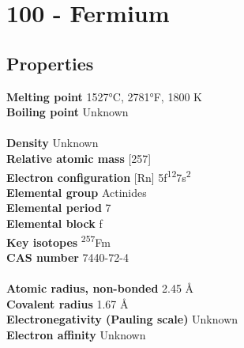 \section{100 - Fermium}
\label{sec:elem-fermium}
\subsection{Properties}
\textbf{Melting point} 1527°C, 2781°F, 1800 K\\
\textbf{Boiling point} Unknown\\
\\
\textbf{Density} Unknown\\
\textbf{Relative atomic mass} [257]\\
\textbf{Electron configuration} [Rn] 5f\textsuperscript{12}7s\textsuperscript{2}\\
\textbf{Elemental group} Actinides\\
\textbf{Elemental period} 7\\
\textbf{Elemental block} f\\
\textbf{Key isotopes} \textsuperscript{257}Fm\\
\textbf{CAS number} 7440-72-4\\
\\
\textbf{Atomic radius, non-bonded} 2.45 Å\\
\textbf{Covalent radius} 1.67 Å\\
\textbf{Electronegativity (Pauling scale)} Unknown\\
\textbf{Electron affinity} Unknown\\
